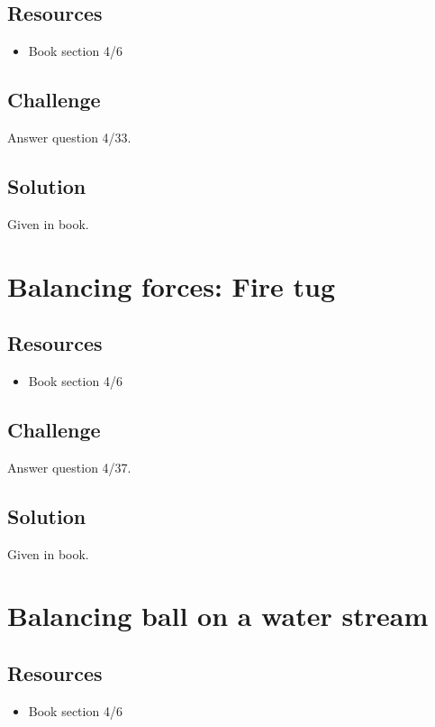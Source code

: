 \subsection*{Resources}
\begin{itemize}
    \item Book section 4/6
\end{itemize}

\subsection*{Challenge}
Answer question 4/33.

\subsection*{Solution}
Given in book.



\newpage
\section{Balancing forces: Fire tug}

\subsection*{Resources}
\begin{itemize}
    \item Book section 4/6
\end{itemize}

\subsection*{Challenge}
Answer question 4/37.

\subsection*{Solution}
Given in book.




\newpage
\section{Balancing ball on a water stream}

\subsection*{Resources}
\begin{itemize}
    \item Book section 4/6
\end{itemize}

